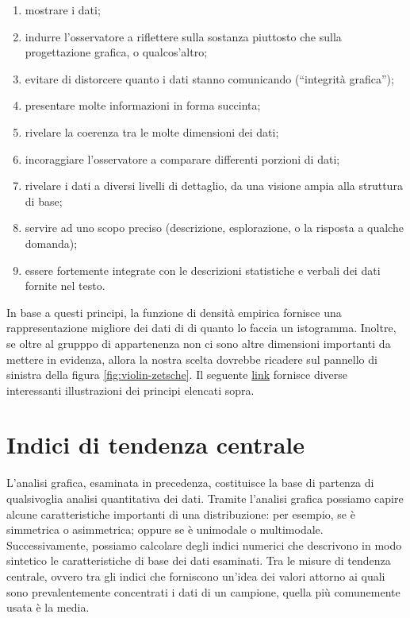 \documentclass[
  11pt,
  italian,
  a4paper,
  extrafontsizes,onecolumn,openright
  ]{memoir}
\providecommand{\tightlist}{%
  \setlength{\itemsep}{0pt}\setlength{\parskip}{0pt}}
\theoremstyle{definition}
\theoremstyle{definition}
\theoremstyle{definition}
\theoremstyle{definition}
\theoremstyle{remark}
\begin{document}
\begin{enumerate}
\def\labelenumi{\arabic{enumi}.}
\tightlist
\item
  mostrare i dati;
\item
  indurre l'osservatore a riflettere sulla sostanza piuttosto che
  sulla progettazione grafica, o qualcos'altro;
\item
  evitare di distorcere quanto i dati stanno comunicando (``integrità
  grafica'');
\item
  presentare molte informazioni in forma succinta;
\item
  rivelare la coerenza tra le molte dimensioni dei dati;
\item
  incoraggiare l'osservatore a comparare differenti porzioni di dati;
\item
  rivelare i dati a diversi livelli di dettaglio, da una visione ampia
  alla struttura di base;
\item
  servire ad uno scopo preciso (descrizione, esplorazione, o la
  risposta a qualche domanda);
\item
  essere fortemente integrate con le descrizioni statistiche e verbali
  dei dati fornite nel testo.
\end{enumerate}

In base a questi principi, la funzione di densità empirica fornisce una
rappresentazione migliore dei dati di \textcite{zetschefuture2019} di quanto lo faccia un istogramma. Inoltre, se oltre al grupppo di appartenenza non ci sono altre dimensioni importanti da mettere in evidenza, allora la nostra scelta dovrebbe ricadere sul pannello di sinistra della figura \ref{fig:violin-zetsche}. Il seguente \href{https://www.biostat.wisc.edu/~kbroman/presentations/graphs2018.pdf}{link} fornisce diverse interessanti illustrazioni dei principi elencati sopra.

\hypertarget{indici-di-tendenza-centrale}{%
\section{Indici di tendenza centrale}\label{indici-di-tendenza-centrale}}

L'analisi grafica, esaminata in precedenza, costituisce la base di
partenza di qualsivoglia analisi quantitativa dei dati. Tramite
l'analisi grafica possiamo capire alcune caratteristiche importanti di
una distribuzione: per esempio, se è simmetrica o asimmetrica; oppure se
è unimodale o multimodale. Successivamente, possiamo calcolare degli
indici numerici che descrivono in modo sintetico le caratteristiche di
base dei dati esaminati. Tra le misure di tendenza centrale, ovvero tra
gli indici che forniscono un'idea dei valori attorno ai quali sono
prevalentemente concentrati i dati di un campione, quella più
comunemente usata è la media.
\end{document}
